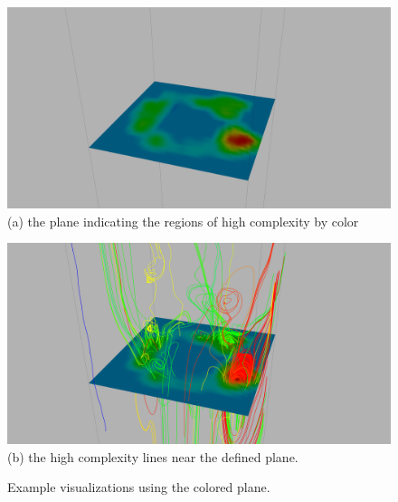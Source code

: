 \documentclass[journal]{vgtc}                %
\begin{document}
\begin{figure}[t]
	\centering
		\begin{minipage}{0.47\linewidth}
			\centering \small
			\includegraphics[height = 0.7\linewidth]{plane.png}\\(a) the plane indicating the regions of high complexity by color\vspace{0.2em}
		\end{minipage}
		\begin{minipage}{0.47\linewidth}
			\centering \small
			\includegraphics[height = 0.7\linewidth]{plane_line.png}\\(b) the high complexity lines near the defined plane.\vspace{0.2em}
		\end{minipage}
	\caption{Example visualizations using the colored plane.}
	\label{fig:plane}
\end{figure}
\end{document}

